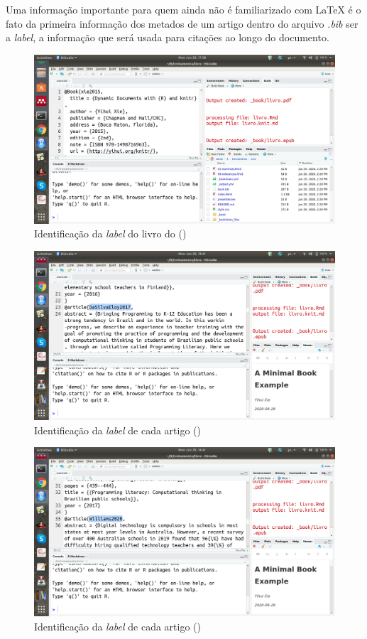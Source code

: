 \documentclass[
  oneside]{book}
\begin{document}
Uma informação importante para quem ainda não
é familiarizado com LaTeX é o fato
da primeira informação dos metados
de um artigo dentro do arquivo \emph{.bib}
ser a \emph{label}, a informação que será
usada para citações ao longo do documento.

\begin{figure}
\centering
\includegraphics{fig/rstudio_open_bookbib_first.png}
\caption{Identificação da \emph{label} do livro do (\citep{xie2015})}
\end{figure}

\begin{figure}
\centering
\includegraphics{fig/rstudio_open_bookbib_second.png}
\caption{Identificação da \emph{label} de cada artigo (\citep{DaSilvaEloy2017})}
\end{figure}

\begin{figure}
\centering
\includegraphics{fig/rstudio_open_bookbib_third.png}
\caption{Identificação da \emph{label} de cada artigo (\citep{Williams2020})}
\end{figure}
\end{document}
